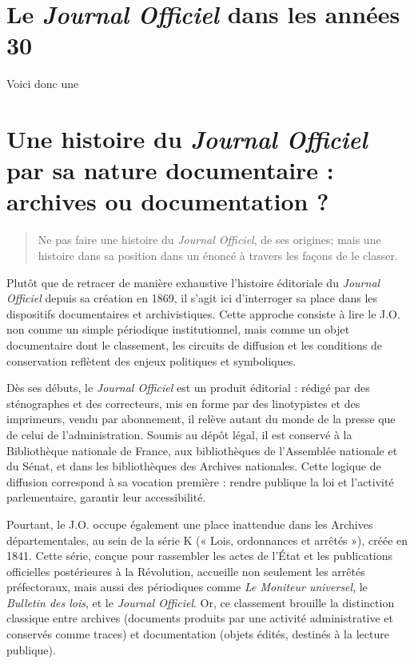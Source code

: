 \section{Le \emph{Journal Officiel} dans les années 30}

Voici donc une 

\section{Une histoire du \emph{Journal Officiel} par sa nature documentaire : archives ou documentation ?}

\begin{quote}
Ne pas faire une histoire du \emph{Journal Officiel}, de ses origines; mais une histoire dans sa position dans un énoncé à travers les façons de le classer.

\end{quote}
Plutôt que de retracer de manière exhaustive l’histoire éditoriale du \emph{Journal Officiel} depuis sa création en 1869, il s’agit ici d’interroger sa place dans les dispositifs documentaires et archivistiques. Cette approche consiste à lire le J.O. non comme un simple périodique institutionnel, mais comme un objet documentaire dont le classement, les circuits de diffusion et les conditions de conservation reflètent des enjeux politiques et symboliques.

Dès ses débuts, le \emph{Journal Officiel} est un produit éditorial : rédigé par des sténographes et des correcteurs, mis en forme par des linotypistes et des imprimeurs, vendu par abonnement, il relève autant du monde de la presse que de celui de l’administration. Soumis au dépôt légal, il est conservé à la Bibliothèque nationale de France, aux bibliothèques de l’Assemblée nationale et du Sénat, et dans les bibliothèques des Archives nationales. Cette logique de diffusion correspond à sa vocation première : rendre publique la loi et l’activité parlementaire, garantir leur accessibilité.

Pourtant, le J.O. occupe également une place inattendue dans les Archives départementales, au sein de la série K (« Lois, ordonnances et arrêtés »), créée en 1841. Cette série, conçue pour rassembler les actes de l’État et les publications officielles postérieures à la Révolution, accueille non seulement les arrêtés préfectoraux, mais aussi des périodiques comme \emph{Le Moniteur universel}, le \emph{Bulletin des lois}, et le \emph{Journal Officiel}. Or, ce classement brouille la distinction classique entre archives (documents produits par une activité administrative et conservés comme traces) et documentation (objets édités, destinés à la lecture publique).

